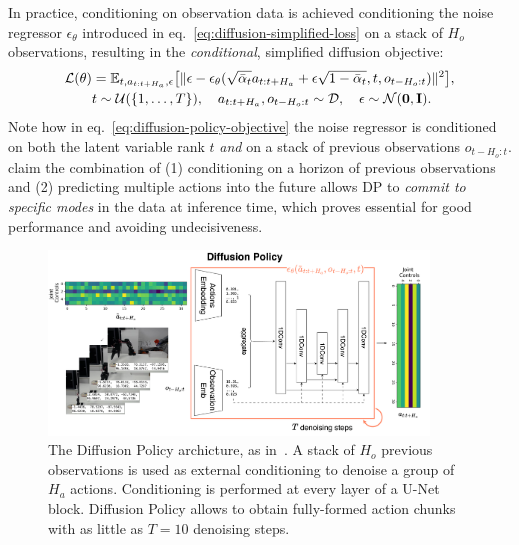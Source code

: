 In practice, conditioning on observation data is achieved conditioning the noise regressor \( \epsilon_\theta \) introduced in eq.~\ref{eq:diffusion-simplified-loss} on a stack of \( H_o \) observations, resulting in the \emph{conditional}, simplified diffusion objective:
\begin{align}
    \mathcal L(\theta) &= \mathbb{E}_{t, a_{t:t+H_a}, \epsilon} \big[
        \Vert \epsilon - \epsilon_\theta(\sqrt{\bar \alpha_t} a_{t:t+H_a} + \epsilon \sqrt{1 - \bar \alpha_t}, t, o_{t-H_o:t}) \Vert^2 \big], \label{eq:diffusion-policy-objective} \\
        & t \sim \mathcal{U}(\{1,\dots,T\}), \quad
        a_{t:t+H_a}, o_{t-H_o:t} \sim \mathcal{D}, \quad
        \epsilon \sim \mathcal{N}(\mathbf{0},\mathbf{I}). \notag 
\end{align}
Note how in eq.~\ref{eq:diffusion-policy-objective} the noise regressor is conditioned on both the latent variable rank \( t \) \emph{and} on a stack of previous observations \(o_{t-H_o:t} \).
\citet{chiDiffusionPolicyVisuomotor2024} claim the combination of (1) conditioning on a horizon of previous observations and (2) predicting multiple actions into the future allows DP to \emph{commit to specific modes} in the data at inference time, which proves essential for good performance and avoiding undecisiveness.

\begin{figure}
    \centering
    \includegraphics[width=0.9\textwidth]{figures/ch4/ch4-diffusion-policy.png}
    \caption{The Diffusion Policy archicture, as in~\citet{chiDiffusionPolicyVisuomotor2024}. A stack of \( H_o \) previous observations is used as external conditioning to denoise a group of \( H_a \) actions. Conditioning is performed at every layer of a U-Net block. Diffusion Policy allows to obtain fully-formed action chunks with as little as \(T=10\) denoising steps.}
    \label{fig:diffusion-policy-architecture}
\end{figure}

